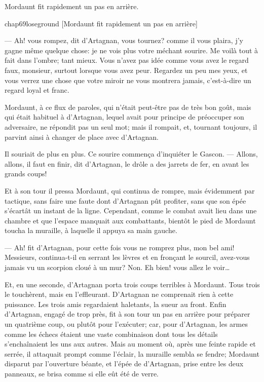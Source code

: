 Mordaunt fit rapidement un pas en arrière.

\begin{bwbigpic}
	[\basicscale] 
	{chap69loseground}
	[Mordaunt fit rapidement un pas en arrière]
\end{bwbigpic}

— Ah! vous rompez, dit d'Artagnan, vous tournez? comme il vous plaira, j'y gagne même quelque chose: je ne vois plus votre méchant sourire. Me voilà tout à fait dans l'ombre; tant mieux. Vous n'avez pas idée comme vous avez le regard faux, monsieur, surtout lorsque vous avez peur. Regardez un peu mes yeux, et vous verrez une chose que votre miroir ne vous montrera jamais, c'est-à-dire un regard loyal et franc.

Mordaunt, à ce flux de paroles, qui n'était peut-être pas de très bon goût, mais qui était habituel à d'Artagnan, lequel avait pour principe de préoccuper son adversaire, ne répondit pas un seul mot; mais il rompait, et, tournant toujours, il parvint ainsi à changer de place avec d'Artagnan.

Il souriait de plus en plus. Ce sourire commença d'inquiéter le Gascon.
— Allons, allons, il faut en finir, dit d'Artagnan, le drôle a des jarrets de fer, en avant les grands coups!

Et à son tour il pressa Mordaunt, qui continua de rompre, mais évidemment par tactique, sans faire une faute dont d'Artagnan pût profiter, sans que son épée s'écartât un instant de la ligne. Cependant, comme le combat avait lieu dans une chambre et que l'espace manquait aux combattants, bientôt le pied de Mordaunt toucha la muraille, à laquelle il appuya sa main gauche.

— Ah! fit d'Artagnan, pour cette fois vous ne romprez plus, mon bel ami! Messieurs, continua-t-il en serrant les lèvres et en fronçant le sourcil, avez-vous jamais vu un scorpion cloué à un mur? Non. Eh bien! vous allez le voir\dots

Et, en une seconde, d'Artagnan porta trois coups terribles à Mordaunt. Tous trois le touchèrent, mais en l'effleurant.
D'Artagnan ne comprenait rien à cette puissance. Les trois amis regardaient haletants, la sueur au front.
Enfin d'Artagnan, engagé de trop près, fit à son tour un pas en arrière pour préparer un quatrième coup, ou plutôt pour l'exécuter; car, pour d'Artagnan, les armes comme les échecs étaient une vaste combinaison dont tous les détails s'enchaînaient les uns aux autres. Mais au moment où, après une feinte rapide et serrée, il attaquait prompt comme l'éclair, la muraille sembla se fendre; Mordaunt disparut par l'ouverture béante, et l'épée de d'Artagnan, prise entre les deux panneaux, se brisa comme si elle eût été de verre.

